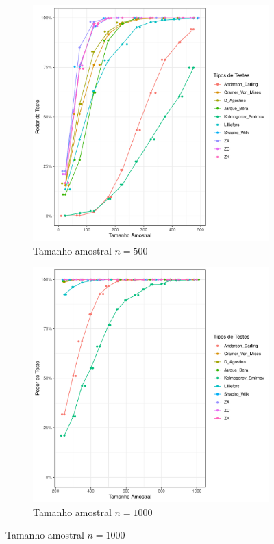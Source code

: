 \documentclass[a4paper,11pt]{article} %
\begin{document}
\begin{figure}[H]
    \vspace{0.5cm} %
    \begin{subfigure}[b]{0.45\textwidth}
        \centering
        \includegraphics[width=\textwidth]{Distribuição Beta/Poder do Teste/poder_teste_beta_500.pdf}
        \caption{Tamanho amostral \(n = 500\)}
        \label{fig:cauchy_poder_500}
    \end{subfigure}
    \hfill
    \begin{subfigure}[b]{0.45\textwidth}
        \centering
        \includegraphics[width=\textwidth]{Distribuição Beta/Poder do Teste/poder_teste_beta_1000.pdf}
        \caption{Tamanho amostral \(n = 1000\)}
        \label{fig:cauchy_poder_1000}
    \end{subfigure}
\end{figure}
\end{document}
